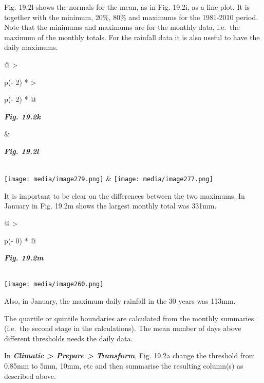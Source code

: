 \documentclass[
  letterpaper,
  DIV=11,
  numbers=noendperiod]{scrreprt}
\begin{document}
Fig. 19.2l shows the normals for the mean, as in Fig. 19.2i, as a line
plot. It is together with the minimum, 20\%, 80\% and maximums for the
1981-2010 period. Note that the minimums and maximums are for the
monthly data, i.e.~the maximum of the monthly totals. For the rainfall
data it is also useful to have the daily maximums.

\begin{longtable}[]{@{}
  >{\raggedright\arraybackslash}p{(\columnwidth - 2\tabcolsep) * }
  >{\raggedright\arraybackslash}p{(\columnwidth - 2\tabcolsep) * }@{}}
\toprule\noalign{}
\begin{minipage}[b]{\linewidth}\raggedright
\textbf{\emph{Fig. 19.2k}}
\end{minipage} & \begin{minipage}[b]{\linewidth}\raggedright
\textbf{\emph{Fig. 19.2l}}
\end{minipage} \\
\midrule\noalign{}
\endhead
\bottomrule\noalign{}
\endlastfoot
\texttt{[image: media/image279.png]} &
\texttt{[image: media/image277.png]} \\
\end{longtable}

It is important to be clear on the differences between the two maximums.
In January in Fig. 19.2m shows the largest monthly total was 331mm.

\begin{longtable}[]{@{}
  >{\raggedright\arraybackslash}p{(\columnwidth - 0\tabcolsep) * }@{}}
\toprule\noalign{}
\begin{minipage}[b]{\linewidth}\raggedright
\textbf{\emph{Fig. 19.2m}}
\end{minipage} \\
\midrule\noalign{}
\endhead
\bottomrule\noalign{}
\endlastfoot
\texttt{[image: media/image260.png]} \\
\end{longtable}

Also, in January, the maximum daily rainfall in the 30 years was 113mm.

The quartile or quintile boundaries are calculated from the monthly
summaries, (i.e.~the second stage in the calculations). The mean number
of days above different thresholds needs the daily data.

In \textbf{\emph{Climatic \textgreater{} Prepare \textgreater{}
Transform}}, Fig. 19.2a change the threshold from 0.85mm to 5mm, 10mm,
etc and then summarise the resulting column(s) as described above.
\end{document}
